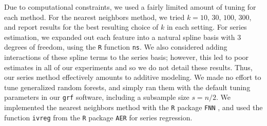 \documentclass[aos]{imsart}
\theoremstyle{plain}
\theoremstyle{definition}
\theoremstyle{remark}
\begin{document}
\begin{CJK}{UTF8}{gbsn}
\begin{appendix}
Due to computational constraints, we used a fairly limited amount of tuning for each method.
For the nearest neighbors method, we tried $k = 10, \, 30, \, 100, \, 300$,
and report results for the best resulting choice of $k$ in each setting.
For series estimation, we expanded out each feature into a natural spline basis with
3 degrees of freedom, using the \texttt{R} function \texttt{ns}. We also considered adding
interactions of these spline terms to the series basis; however, this led to poor estimates
in all of our experiments and so we do not detail these results. Thus, our series method
effectively amounts to additive modeling.
We made no effort to tune generalized random forests, and simply ran them with the default
tuning parameters in our \texttt{grf} software, including a subsample size $s = n/2$.
We implemented the nearest neighbors method with the \texttt{R} package \texttt{FNN}
\citep{beygelzimer2013fnn}, and used the function \texttt{ivreg} from the \texttt{R}
package \texttt{AER} \citep{kleiber2008applied} for series regression.


\end{appendix}
\end{CJK}
\end{document}
